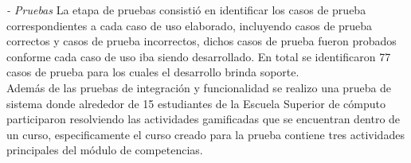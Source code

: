     {\it - Pruebas}
    La etapa de pruebas consistió en identificar los casos de prueba correspondientes
    a cada caso de uso elaborado, incluyendo casos de prueba correctos y casos de
    prueba incorrectos, dichos casos de prueba fueron probados conforme cada caso de 
    uso iba siendo desarrollado. En total se identificaron 77 casos de prueba para
    los cuales el desarrollo brinda soporte.\\

    Además de las pruebas de integración y funcionalidad se realizo una prueba de
    sistema donde alrededor de 15 estudiantes de la Escuela Superior de cómputo
    participaron resolviendo las actividades gamificadas que se encuentran dentro de
    un curso, especificamente el curso creado para la prueba contiene tres actividades
    principales del módulo de competencias.


